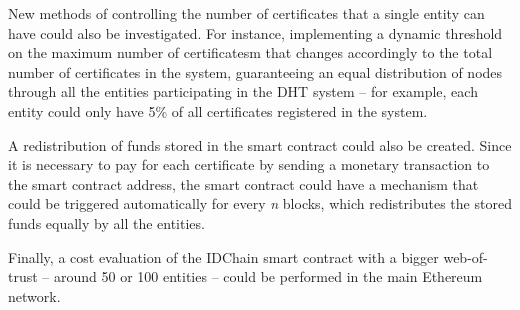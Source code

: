 New methods of controlling the number of certificates that a single entity can have could also be investigated.
For instance, implementing a dynamic threshold on the maximum number of certificatesm that changes accordingly to the total number of certificates in the system, guaranteeing an equal distribution of nodes through all the entities participating in the DHT system – for example, each entity could only have 5\% of all certificates registered in the system.

A redistribution of funds stored in the smart contract could also be created.
Since it is necessary to pay for each certificate by sending a monetary transaction to the smart contract address, the smart contract could have a mechanism that could be triggered automatically for every \textit{n} blocks, which redistributes the stored funds equally by all the entities.

Finally, a cost evaluation of the IDChain smart contract with a bigger web-of-trust – around 50 or 100 entities – could be performed in the main Ethereum network.

\cleardoublepage
